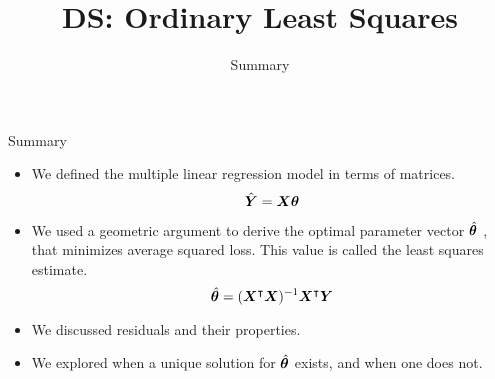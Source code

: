 \documentclass[aspectratio=169]{../latex_main/tntbeamer}  %
\title[Regression]{DS: Ordinary Least Squares}
\subtitle{Summary}
\begin{document}
	
	\maketitle
	\begin{frame}{Summary}
	    \begin{itemize}
	        \item We defined the multiple linear regression model in terms of matrices.
	        \begin{equation*}
	            \hat{\bm{Y}} = \bm{X}\bm{\theta}
	        \end{equation*}
	        \item We used a geometric argument to derive the optimal parameter vector   $\hat{\bm{\theta}}$  , that minimizes average squared loss. This value is called the least squares estimate.
	        \begin{equation*}
	            \hat{\bm{\theta}} = (\bm{X}^\intercal\bm{X})^{-1} \bm{X}^\intercal\bm{Y}
	        \end{equation*}
	        \item We discussed residuals and their properties.
	        \item We explored when a unique solution for   $\hat{\bm{\theta}}$     exists, and when one does not.
	    \end{itemize}
	\end{frame}
	
\end{document}
